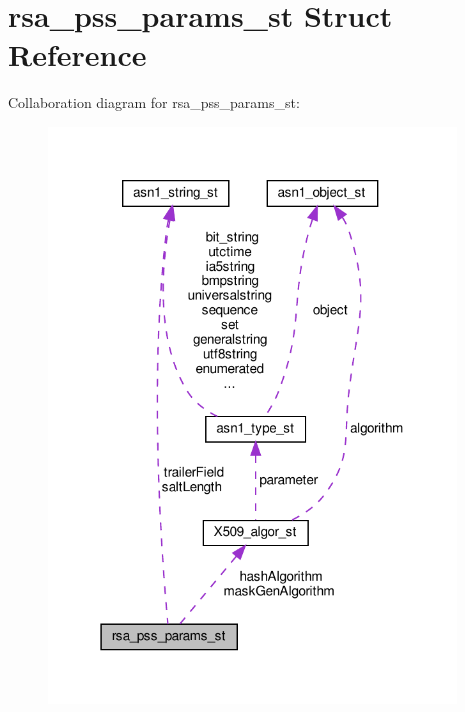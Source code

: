 \hypertarget{structrsa__pss__params__st}{}\section{rsa\+\_\+pss\+\_\+params\+\_\+st Struct Reference}
\label{structrsa__pss__params__st}


Collaboration diagram for rsa\+\_\+pss\+\_\+params\+\_\+st\+:
\nopagebreak
\begin{figure}[H]
\begin{center}
\leavevmode
\includegraphics[width=307pt]{structrsa__pss__params__st__coll__graph}
\end{center}
\end{figure}

